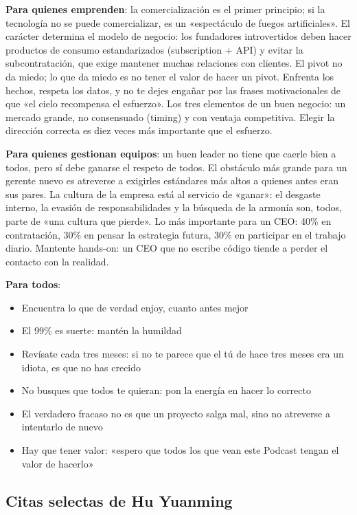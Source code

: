 \textbf{Para quienes emprenden}: la comercialización es el primer principio; si la tecnología no se puede comercializar, es un «espectáculo de fuegos artificiales». El carácter determina el modelo de negocio: los fundadores introvertidos deben hacer productos de consumo estandarizados (subscription + API) y evitar la subcontratación, que exige mantener muchas relaciones con clientes. El pivot no da miedo; lo que da miedo es no tener el valor de hacer un pivot. Enfrenta los hechos, respeta los datos, y no te dejes engañar por las frases motivacionales de que «el cielo recompensa el esfuerzo». Los tres elementos de un buen negocio: un mercado grande, no consensuado (timing) y con ventaja competitiva. Elegir la dirección correcta es diez veces más importante que el esfuerzo.

\textbf{Para quienes gestionan equipos}: un buen leader no tiene que caerle bien a todos, pero sí debe ganarse el respeto de todos. El obstáculo más grande para un gerente nuevo es atreverse a exigirles estándares más altos a quienes antes eran sus pares. La cultura de la empresa está al servicio de «ganar»: el desgaste interno, la evasión de responsabilidades y la búsqueda de la armonía son, todos, parte de «una cultura que pierde». Lo más importante para un CEO: 40\% en contratación, 30\% en pensar la estrategia futura, 30\% en participar en el trabajo diario. Mantente hands-on: un CEO que no escribe código tiende a perder el contacto con la realidad.

\textbf{Para todos}:
\begin{itemize}
\item Encuentra lo que de verdad enjoy, cuanto antes mejor
\item El 99\% es suerte: mantén la humildad
\item Revísate cada tres meses: si no te parece que el tú de hace tres meses era un idiota, es que no has crecido
\item No busques que todos te quieran: pon la energía en hacer lo correcto
\item El verdadero fracaso no es que un proyecto salga mal, sino no atreverse a intentarlo de nuevo
\item Hay que tener valor: «espero que todos los que vean este Podcast tengan el valor de hacerlo»
\end{itemize}

\subsection{Citas selectas de Hu Yuanming}

